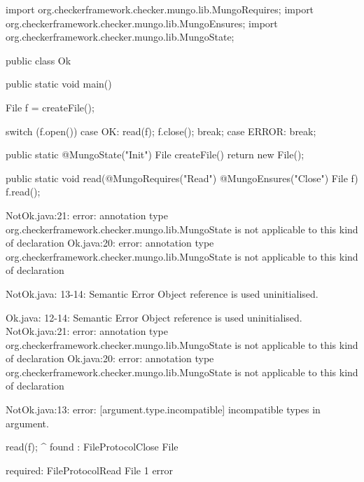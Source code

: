 \begin{code}
import org.checkerframework.checker.mungo.lib.MungoRequires;
import org.checkerframework.checker.mungo.lib.MungoEnsures;
import org.checkerframework.checker.mungo.lib.MungoState;

public class Ok {

  public static void main() {
    File f = createFile();

    switch (f.open()) {
      case OK:
        read(f);
        f.close();
        break;
      case ERROR:
        break;
    }
  }
  
  public static @MungoState("Init") File createFile() {
    return new File();
  }

  public static void read(@MungoRequires("Read") @MungoEnsures("Close") File f) {
    f.read();
  }

}\end{code}

\lstset{language=,caption=Mungo's output}
\begin{code}
NotOk.java:21: error: annotation type org.checkerframework.checker.mungo.lib.MungoState is not applicable to this kind of declaration
Ok.java:20: error: annotation type org.checkerframework.checker.mungo.lib.MungoState is not applicable to this kind of declaration

NotOk.java: 13-14: Semantic Error
		Object reference is used uninitialised.

Ok.java: 12-14: Semantic Error
		Object reference is used uninitialised.
NotOk.java:21: error: annotation type org.checkerframework.checker.mungo.lib.MungoState is not applicable to this kind of declaration
Ok.java:20: error: annotation type org.checkerframework.checker.mungo.lib.MungoState is not applicable to this kind of declaration
\end{code}

\lstset{language=,caption=Our tool's output}
\begin{code}
NotOk.java:13: error: [argument.type.incompatible] incompatible types in argument.

        read(f);
             ^
  found   : FileProtocol{Close} File

  required: FileProtocol{Read} File
1 error
\end{code}

